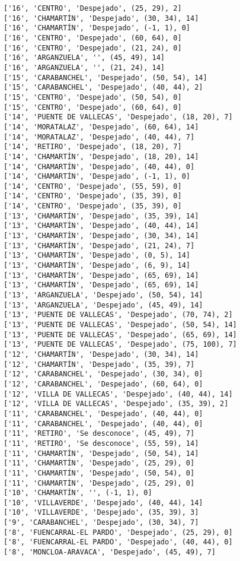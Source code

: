 \documentclass[11pt]{article}
\begin{document}
\begin{Verbatim}[commandchars=\\\{\}]
['16', 'CENTRO', 'Despejado', (25, 29), 2]
['16', 'CHAMARTÍN', 'Despejado', (30, 34), 14]
['16', 'CHAMARTÍN', 'Despejado', (-1, 1), 0]
['16', 'CENTRO', 'Despejado', (60, 64), 0]
['16', 'CENTRO', 'Despejado', (21, 24), 0]
['16', 'ARGANZUELA', '', (45, 49), 14]
['16', 'ARGANZUELA', '', (21, 24), 14]
['15', 'CARABANCHEL', 'Despejado', (50, 54), 14]
['15', 'CARABANCHEL', 'Despejado', (40, 44), 2]
['15', 'CENTRO', 'Despejado', (50, 54), 0]
['15', 'CENTRO', 'Despejado', (60, 64), 0]
['14', 'PUENTE DE VALLECAS', 'Despejado', (18, 20), 7]
['14', 'MORATALAZ', 'Despejado', (60, 64), 14]
['14', 'MORATALAZ', 'Despejado', (40, 44), 7]
['14', 'RETIRO', 'Despejado', (18, 20), 7]
['14', 'CHAMARTÍN', 'Despejado', (18, 20), 14]
['14', 'CHAMARTÍN', 'Despejado', (40, 44), 0]
['14', 'CHAMARTÍN', 'Despejado', (-1, 1), 0]
['14', 'CENTRO', 'Despejado', (55, 59), 0]
['14', 'CENTRO', 'Despejado', (35, 39), 0]
['14', 'CENTRO', 'Despejado', (35, 39), 0]
['13', 'CHAMARTÍN', 'Despejado', (35, 39), 14]
['13', 'CHAMARTÍN', 'Despejado', (40, 44), 14]
['13', 'CHAMARTÍN', 'Despejado', (30, 34), 14]
['13', 'CHAMARTÍN', 'Despejado', (21, 24), 7]
['13', 'CHAMARTÍN', 'Despejado', (0, 5), 14]
['13', 'CHAMARTÍN', 'Despejado', (6, 9), 14]
['13', 'CHAMARTÍN', 'Despejado', (65, 69), 14]
['13', 'CHAMARTÍN', 'Despejado', (65, 69), 14]
['13', 'ARGANZUELA', 'Despejado', (50, 54), 14]
['13', 'ARGANZUELA', 'Despejado', (45, 49), 14]
['13', 'PUENTE DE VALLECAS', 'Despejado', (70, 74), 2]
['13', 'PUENTE DE VALLECAS', 'Despejado', (50, 54), 14]
['13', 'PUENTE DE VALLECAS', 'Despejado', (65, 69), 14]
['13', 'PUENTE DE VALLECAS', 'Despejado', (75, 100), 7]
['12', 'CHAMARTÍN', 'Despejado', (30, 34), 14]
['12', 'CHAMARTÍN', 'Despejado', (35, 39), 7]
['12', 'CARABANCHEL', 'Despejado', (30, 34), 0]
['12', 'CARABANCHEL', 'Despejado', (60, 64), 0]
['12', 'VILLA DE VALLECAS', 'Despejado', (40, 44), 14]
['12', 'VILLA DE VALLECAS', 'Despejado', (35, 39), 2]
['11', 'CARABANCHEL', 'Despejado', (40, 44), 0]
['11', 'CARABANCHEL', 'Despejado', (40, 44), 0]
['11', 'RETIRO', 'Se desconoce', (45, 49), 7]
['11', 'RETIRO', 'Se desconoce', (55, 59), 14]
['11', 'CHAMARTÍN', 'Despejado', (50, 54), 14]
['11', 'CHAMARTÍN', 'Despejado', (25, 29), 0]
['11', 'CHAMARTÍN', 'Despejado', (50, 54), 0]
['11', 'CHAMARTÍN', 'Despejado', (25, 29), 0]
['10', 'CHAMARTÍN', '', (-1, 1), 0]
['10', 'VILLAVERDE', 'Despejado', (40, 44), 14]
['10', 'VILLAVERDE', 'Despejado', (35, 39), 3]
['9', 'CARABANCHEL', 'Despejado', (30, 34), 7]
['8', 'FUENCARRAL-EL PARDO', 'Despejado', (25, 29), 0]
['8', 'FUENCARRAL-EL PARDO', 'Despejado', (40, 44), 0]
['8', 'MONCLOA-ARAVACA', 'Despejado', (45, 49), 7]

\end{Verbatim}
\end{document}
